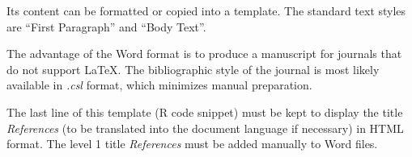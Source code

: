 \documentclass[fleqn,]{article} %
\begin{document}
Its content can be formatted or copied into a template.
The standard text styles are ``First Paragraph'' and ``Body Text''.

The advantage of the Word format is to produce a manuscript for journals that do not support LaTeX.
The bibliographic style of the journal is most likely available in \emph{.csl} format, which minimizes manual preparation.

The last line of this template (R code snippet) must be kept to display the title \emph{References} (to be translated into the document language if necessary) in HTML format.
The level 1 title \emph{References} must be added manually to Word files.



\makeatletter

\makeatother


\end{document}
